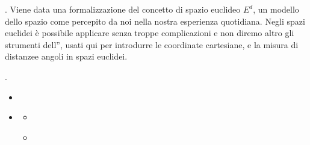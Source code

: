 \documentclass[letterpaper,10pt,italian]{jupyterBook}
\begin{document}
\sphinxAtStartPar
{\hyperref[\detokenize{ch/analytic_geometry/euclidean_space:geometry-analytic-euclidean-space}]{}}. Viene data una formalizzazione del concetto di spazio euclideo \(E^d\), un modello dello spazio come percepito da noi nella nostra esperienza quotidiana. Negli spazi euclidei è possibile applicare senza troppe complicazioni \sphinxhyphen{} e non diremo altro \sphinxhyphen{} gli strumenti dell”{\hyperref[\detokenize{ch/algebra/vector-algebra:math-hs-algebra-vector}]{}}, usati qui per introdurre le coordinate cartesiane, e la misura di distanzee angoli in spazi euclidei.

\sphinxAtStartPar
{\hyperref[\detokenize{ch/analytic_geometry/analytic_geometry_2d:geometry-analytic-2d}]{}}.
\begin{itemize}
\item {} 
\sphinxAtStartPar
{\hyperref[\detokenize{ch/analytic_geometry/analytic_geometry_2d/coordinates:geometry-analytic-2d-coordinates}]{}}

\item {} 
\sphinxAtStartPar
{\hyperref[\detokenize{ch/analytic_geometry/analytic_geometry_2d/curves:geometry-analytic-2d-curves}]{}}
\begin{itemize}
\item {} 
\sphinxAtStartPar
{\hyperref[\detokenize{ch/analytic_geometry/analytic_geometry_2d/lines:geometry-analytic-2d-lines}]{}}

\item {} 
\sphinxAtStartPar
{\hyperref[\detokenize{ch/analytic_geometry/analytic_geometry_2d/conics:geometry-analytic-2d-conics}]{}}

\end{itemize}

\end{itemize}
\end{document}

